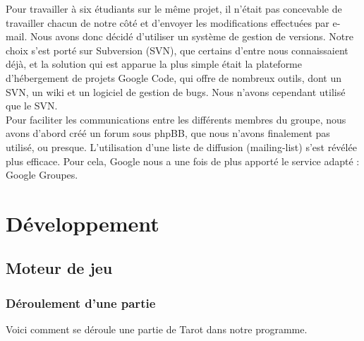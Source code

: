 \documentclass[a4paper]{report}
\begin{document}
		Pour travailler à six étudiants sur le même projet, il n’était pas concevable de travailler chacun de notre côté et d’envoyer les modifications effectuées par e-mail. Nous avons donc 			décidé d’utiliser un système de gestion de versions. Notre choix s’est porté sur Subversion (SVN), que certains d’entre nous connaissaient déjà, et la solution qui est apparue la plus 		simple était la plateforme d’hébergement de projets Google Code, qui offre de nombreux outils, dont un SVN, un wiki et un logiciel de gestion de bugs. Nous n’avons cependant utilisé que 			le SVN.\\

		Pour faciliter les communications entre les différents membres du groupe, nous avons d’abord créé un forum sous phpBB, que nous n’avons finalement pas utilisé, ou presque. L’utilisation 			d’une liste de diffusion (mailing-list) s’est révélée plus efficace. Pour cela, Google nous a une fois de plus apporté le service adapté : Google Groupes.\\
















\chapter{Développement}
	\section{Moteur de jeu}
		
		
		\subsection{Déroulement d'une partie}
			Voici comment se déroule une partie de Tarot dans notre programme.
\end{document}
